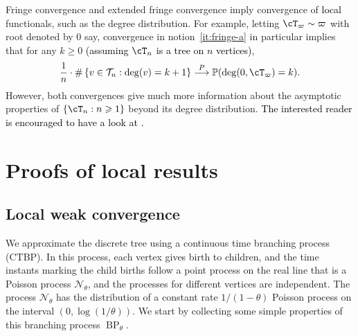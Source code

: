 \documentclass[letterpaper,11pt,reqno]{amsart}
\theoremstyle{definition}
\renewcommand{\geq}{\geqslant}
\newcommand{\set}[1]{\left\{#1\right\}}
\newcommand{\TT}{\mathcal{T}}
\newcommand{\prob}{\mathbb{P}}
\newcommand{\convp}{\stackrel{P}{\longrightarrow}}
\DeclareMathOperator{\BP}{BP}
\begin{document}
Fringe convergence and extended fringe convergence imply convergence of \textcolor{black}{local} functionals, such as the degree distribution. For example, letting $\cT_{\varpi} \sim \varpi$ with root denoted by $0$ say, convergence in notion~\eqref{it:fringe-a} in particular implies that for any $k\geq 0$ \textcolor{black}{(assuming $\cT_n$ is a tree on $n$ vertices)}, 
\begin{align}
\label{eqn:deg-convg-fr}
\frac1n\cdot\#\set{v\in \TT_n: \deg(v) = k+1} \convp \prob(\deg(0,\cT_{\varpi})=k).
\end{align}
However, both convergences give much more information about the asymptotic properties of $\set{\cT_n:n\geq 1}$ beyond its degree distribution. \textcolor{black}{The interested reader is encouraged to have a look at \cite{aldous-fringe}.}






\section{Proofs of local results}
\label{sec:proofs}
\subsection{Local weak convergence}


We approximate the discrete tree using a continuous time branching process (CTBP). In this process, each vertex gives birth to children, and the time instants marking the child births follow a point process on the real line that is a Poisson process $\mathcal{N}_{\theta}$, and the processes for different vertices are independent. The process $\mathcal{N}_{\theta}$ has the distribution of a constant rate $1/(1-\theta)$ Poisson process on the interval $(0,\log(1/\theta))$. We start by collecting some simple properties of this branching process $\BP_{\theta}$. 
\end{document}
